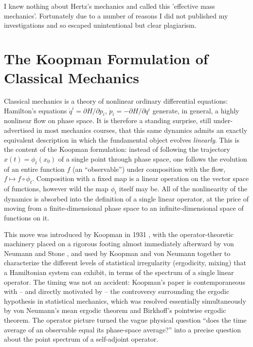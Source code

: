 I knew nothing about Hertz's mechanics and called this 'effective mass 
mechanics'. Fortunately due to a number of reasons I did not published
my investigations and so escaped unintentional but clear plagiarism.


\section{The Koopman Formulation of Classical Mechanics}
\label{frm:koop}


Classical mechanics is
a theory of nonlinear ordinary differential equations: Hamilton's equations
$\dot q^i = \partial H/\partial p_i$, $\dot p_i = -\partial H/\partial q^i$
generate, in general, a highly nonlinear flow on phase space. It is therefore a
standing surprise, still under-advertised in most mechanics courses, that this
same dynamics admits an exactly equivalent description in which the fundamental
object evolves \emph{linearly}. This is the content of the Koopman formulation:
instead of following the trajectory $x(t)=\phi_t(x_0)$ of a single point
through phase space, one follows the evolution of an entire function $f$ (an
``observable'') under composition with the flow, $f \mapsto f\circ\phi_t$.
Composition with a fixed map is a linear operation on the vector space of
functions, however wild the map $\phi_t$ itself may be. All of the nonlinearity
of the dynamics is absorbed into the definition of a single linear operator, at
the price of moving from a finite-dimensional phase space to an
infinite-dimensional space of functions on it.

This move was introduced by Koopman in 1931 \cite{Koopman1931}, with the
operator-theoretic machinery placed on a rigorous footing almost immediately
afterward by von Neumann \cite{Neumann1932} and Stone \cite{Stone1932}, and used
by Koopman and von Neumann together to characterize the different levels of
statistical irregularity (ergodicity, mixing) that a Hamiltonian system can
exhibit, in terms of the spectrum of a single linear operator.
The timing was not an accident: Koopman's paper
is contemporaneous with -- and directly motivated by -- the controversy
surrounding the ergodic hypothesis in statistical mechanics, which was resolved
essentially simultaneously by von Neumann's mean ergodic theorem and Birkhoff's
pointwise ergodic theorem. The operator picture turned the
vague physical question ``does the time average of an observable equal its
phase-space average?'' into a precise question about the point spectrum of a
self-adjoint operator.

